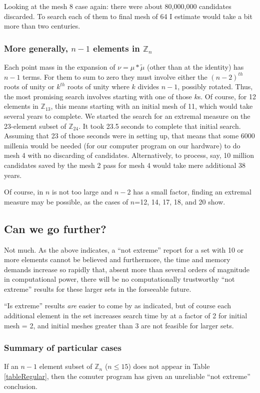 \documentclass[letter,11pt]{amsart}
\numberwithin{theorem}{section}
\theoremstyle{remark}
\numberwithin{equation}{section}
\newcommand\Zp[2]{\texttt{$\mathbb Z_{#1}^{\	#2}$}}
\begin{document}
 Looking at the mesh 8 case again: there were about 80,000,000 candidates discarded. To search each of them
   to final mesh of 64 I estimate would take a bit more than two centuries.
   
   \subsubsection{More generally, $n-1$ elements in \Zp{n}{}} Each point mass in the expansion of $\nu=\mu*\tilde\mu$ 
   (other than at the  identity) has $n-1$ terms. For them to sum to zero they must involve either the
   $(n-2)^{th}$ roots of unity or $k^{th}$ roots of unity where $k$ divides $n-1$, possibly rotated.
   Thus, the most promising search involves starting with one of those $k$s. Of course, for 12 elements in \Zp{13}{},
   this means starting with an initial mesh of 11, which would take several years to complete.  We started the
   search for an extremal measure on the 23-element subset of \Zp{24}{}. It took 23.5 seconds to complete 
   that initial search. Assuming that 23 of those seconds were in setting up, that means that some 6000
   millenia would be needed (for our computer program on our hardware) to do mesh 4 with no discarding of
   candidates.  Alternatively, to process, say, 10 million candidates saved by the mesh 2 pass for mesh 4
   would take  mere additional 38 years.
   
   Of course, in $n$ is not too large and $n-2$ has a small 
   factor, finding an extremal measure may be possible, as the cases of $n$=12, 14, 17, 18, and 20
   show.
\smallbreak 
 
 \subsection{Can we go further?}
 Not much. As the above indicates,   a ``not extreme'' report for a set with 10 or 
 more elements cannot be believed and furthermore, the time and memory demands increase so rapidly that, absent
 more than several orders of magnitude in computational power, 
 there will be no computationally trustworthy ``not extreme'' results
 for these larger sets in the forseeable future.
 
 ``Is extreme'' results \emph{are} easier to come by as indicated, but of course each additional element in the
 set increases search time by at a factor of 2 for initial mesh = 2,
  and initial meshes greater than 3 are not feasible 
 for larger sets.
 
 \subsubsection{Summary of particular cases}
 If an $n-1$ element subset of \Zp{n}{} ($n\le 15$) does not appear in Table \ref{tableRegular}, then the comuter
 program has given an unreliable ``not extreme'' conclusion.
\end{document}
